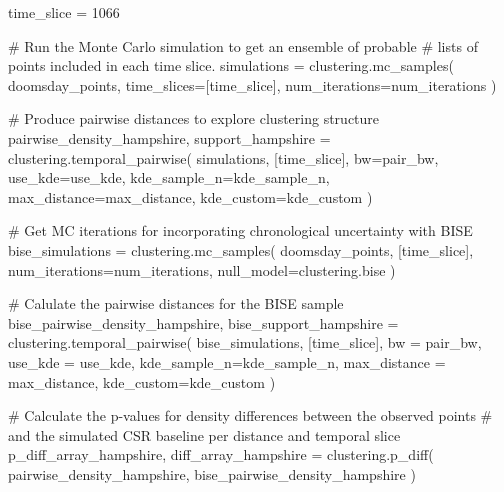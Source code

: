 \documentclass[
  11pt,
  letterpaper,
  DIV=11,
  numbers=noendperiod]{scrartcl}
\newenvironment{Shaded}{\begin{snugshade}}{\end{snugshade}}
\newcommand{\CommentTok}[1]{\textcolor[rgb]{0.37,0.37,0.37}{#1}}
\newcommand{\DecValTok}[1]{\textcolor[rgb]{0.68,0.00,0.00}{#1}}
\newcommand{\NormalTok}[1]{\textcolor[rgb]{0.00,0.23,0.31}{#1}}
\newcommand{\OperatorTok}[1]{\textcolor[rgb]{0.37,0.37,0.37}{#1}}
\begin{document}
\begin{Shaded}
\begin{Highlighting}[]
\NormalTok{time\_slice }\OperatorTok{=} \DecValTok{1066}

\CommentTok{\# Run the Monte Carlo simulation to get an ensemble of probable }
\CommentTok{\# lists of points included in each time slice.}
\NormalTok{simulations }\OperatorTok{=}\NormalTok{ clustering.mc\_samples(}
\NormalTok{    doomsday\_points, }
\NormalTok{    time\_slices}\OperatorTok{=}\NormalTok{[time\_slice],  }
\NormalTok{    num\_iterations}\OperatorTok{=}\NormalTok{num\_iterations}
\NormalTok{)}

\CommentTok{\# Produce pairwise distances to explore clustering structure}
\NormalTok{pairwise\_density\_hampshire, support\_hampshire }\OperatorTok{=}\NormalTok{ clustering.temporal\_pairwise(}
\NormalTok{    simulations, }
\NormalTok{    [time\_slice],}
\NormalTok{    bw}\OperatorTok{=}\NormalTok{pair\_bw, }
\NormalTok{    use\_kde}\OperatorTok{=}\NormalTok{use\_kde, }
\NormalTok{    kde\_sample\_n}\OperatorTok{=}\NormalTok{kde\_sample\_n,}
\NormalTok{    max\_distance}\OperatorTok{=}\NormalTok{max\_distance,}
\NormalTok{    kde\_custom}\OperatorTok{=}\NormalTok{kde\_custom}
\NormalTok{)}

\CommentTok{\# Get MC iterations for incorporating chronological uncertainty with BISE}
\NormalTok{bise\_simulations }\OperatorTok{=}\NormalTok{ clustering.mc\_samples(}
\NormalTok{    doomsday\_points, }
\NormalTok{    [time\_slice], }
\NormalTok{    num\_iterations}\OperatorTok{=}\NormalTok{num\_iterations,}
\NormalTok{    null\_model}\OperatorTok{=}\NormalTok{clustering.bise}
\NormalTok{)}

\CommentTok{\# Calulate the pairwise distances for the BISE sample}
\NormalTok{bise\_pairwise\_density\_hampshire, bise\_support\_hampshire }\OperatorTok{=}\NormalTok{ clustering.temporal\_pairwise(}
\NormalTok{    bise\_simulations, }
\NormalTok{    [time\_slice], }
\NormalTok{    bw }\OperatorTok{=}\NormalTok{ pair\_bw, }
\NormalTok{    use\_kde }\OperatorTok{=}\NormalTok{ use\_kde,}
\NormalTok{    kde\_sample\_n}\OperatorTok{=}\NormalTok{kde\_sample\_n, }
\NormalTok{    max\_distance }\OperatorTok{=}\NormalTok{ max\_distance,}
\NormalTok{    kde\_custom}\OperatorTok{=}\NormalTok{kde\_custom}
\NormalTok{)}

\CommentTok{\# Calculate the p{-}values for density differences between the observed points }
\CommentTok{\# and the simulated CSR baseline per distance and temporal slice}
\NormalTok{p\_diff\_array\_hampshire, diff\_array\_hampshire }\OperatorTok{=}\NormalTok{ clustering.p\_diff(}
\NormalTok{    pairwise\_density\_hampshire, }
\NormalTok{    bise\_pairwise\_density\_hampshire}
\NormalTok{)}
\end{Highlighting}
\end{Shaded}
\end{document}
